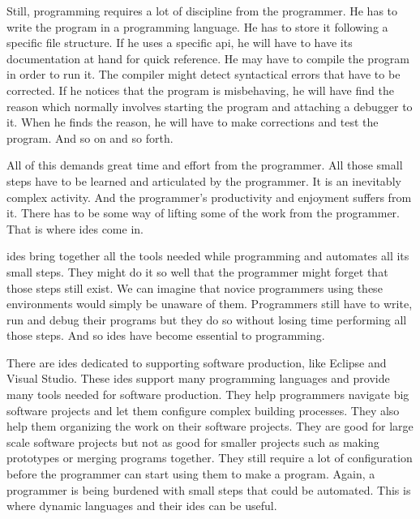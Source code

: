 \documentclass{./llncs2e/llncs}
\begin{document}
	Still, programming requires a lot of discipline from the programmer.
	He has to write the program in a programming language.
	He has to store it following a specific file structure.
	If he uses a specific \ac{api}, he will have to have its documentation at hand for quick reference.
	He may have to compile the program in order to run it.
	The compiler might detect syntactical errors that have to be corrected.
	If he notices that the program is misbehaving, he will have find the reason which normally involves starting the program and attaching a debugger to it.
	When he finds the reason, he will have to make corrections and test the program.
	And so on and so forth.

	All of this demands great time and effort from the programmer.
	All those small steps have to be learned and articulated by the programmer.
	It is an inevitably complex activity.
	And the programmer's productivity and enjoyment suffers from it.
	There has to be some way of lifting some of the work from the programmer.
	That is where \ac{ide}s come in.

	\ac{ide}s bring together all the tools needed while programming and automates all its small steps.
	They might do it so well that the programmer might forget that those steps still exist.
	We can imagine that novice programmers using these environments would simply be unaware of them.
	Programmers still have to write, run and debug their programs but they do so without losing time performing all those steps.
	And so \ac{ide}s have become essential to programming.
	
	There are \ac{ide}s dedicated to supporting software production, like Eclipse\cite{eclipse2007eclipse} and Visual Studio\cite{mvs2002mvs}.
	These \ac{ide}s support many programming languages and provide many tools needed for software production.
	They help programmers navigate big software projects and let them configure complex building processes.
	They also help them organizing the work on their software projects.
	They are good for large scale software projects but not as good for smaller projects such as making prototypes or merging programs together.
	They still require a lot of configuration before the programmer can start using them to make a program.
	Again, a programmer is being burdened with small steps that could be automated.
	This is where dynamic languages and their \ac{ide}s can be useful.
\end{document}
